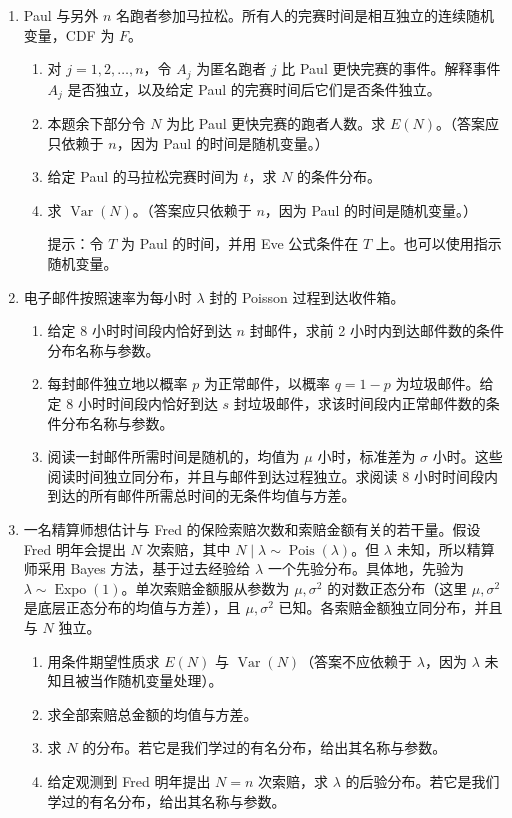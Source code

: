 \documentclass[UTF8, 12pt, fontset=fandol, oneside]{ctexart}
\begin{document}
\begin{enumerate}
  \item Paul 与另外 $n$ 名跑者参加马拉松。所有人的完赛时间是相互独立的连续随机变量，CDF 为 $F$。
  \begin{enumerate}
    \item[(a)] 对 $j=1,2,\ldots,n$，令 $A_j$ 为匿名跑者 $j$ 比 Paul 更快完赛的事件。解释事件 $A_j$ 是否独立，以及给定 Paul 的完赛时间后它们是否条件独立。
    \item[(b)] 本题余下部分令 $N$ 为比 Paul 更快完赛的跑者人数。求 $E(N)$。（答案应只依赖于 $n$，因为 Paul 的时间是随机变量。）
    \item[(c)] 给定 Paul 的马拉松完赛时间为 $t$，求 $N$ 的条件分布。
    \item[(d)] 求 $\operatorname{Var}(N)$。（答案应只依赖于 $n$，因为 Paul 的时间是随机变量。）

    \noindent 提示：令 $T$ 为 Paul 的时间，并用 Eve 公式条件在 $T$ 上。也可以使用指示随机变量。
  \end{enumerate}

  \item 电子邮件按照速率为每小时 $\lambda$ 封的 Poisson 过程到达收件箱。
  \begin{enumerate}
    \item[(a)] 给定 8 小时时间段内恰好到达 $n$ 封邮件，求前 2 小时内到达邮件数的条件分布名称与参数。
    \item[(b)] 每封邮件独立地以概率 $p$ 为正常邮件，以概率 $q=1-p$ 为垃圾邮件。给定 8 小时时间段内恰好到达 $s$ 封垃圾邮件，求该时间段内正常邮件数的条件分布名称与参数。
    \item[(c)] 阅读一封邮件所需时间是随机的，均值为 $\mu$ 小时，标准差为 $\sigma$ 小时。这些阅读时间独立同分布，并且与邮件到达过程独立。求阅读 8 小时时间段内到达的所有邮件所需总时间的无条件均值与方差。
  \end{enumerate}

  \item 一名精算师想估计与 Fred 的保险索赔次数和索赔金额有关的若干量。假设 Fred 明年会提出 $N$ 次索赔，其中 $N\mid\lambda\sim\operatorname{Pois}(\lambda)$。但 $\lambda$ 未知，所以精算师采用 Bayes 方法，基于过去经验给 $\lambda$ 一个先验分布。具体地，先验为 $\lambda\sim\operatorname{Expo}(1)$。单次索赔金额服从参数为 $\mu,\sigma^2$ 的对数正态分布（这里 $\mu,\sigma^2$ 是底层正态分布的均值与方差），且 $\mu,\sigma^2$ 已知。各索赔金额独立同分布，并且与 $N$ 独立。
  \begin{enumerate}
    \item[(a)] 用条件期望性质求 $E(N)$ 与 $\operatorname{Var}(N)$（答案不应依赖于 $\lambda$，因为 $\lambda$ 未知且被当作随机变量处理）。
    \item[(b)] 求全部索赔总金额的均值与方差。
    \item[(c)] 求 $N$ 的分布。若它是我们学过的有名分布，给出其名称与参数。
    \item[(d)] 给定观测到 Fred 明年提出 $N=n$ 次索赔，求 $\lambda$ 的后验分布。若它是我们学过的有名分布，给出其名称与参数。
  \end{enumerate}


\end{enumerate}
\end{document}
